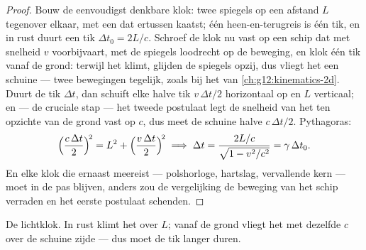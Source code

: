 \begin{proof}
Bouw de eenvoudigst denkbare klok: twee spiegels op een afstand $L$ tegenover
elkaar, met een  dat ertussen kaatst; één heen-en-terugreis is één tik, en
in rust duurt een tik $\Delta t_0 = 2L/c$. Schroef de klok nu vast op een schip
dat met snelheid $v$ voorbijvaart, met de spiegels loodrecht op de beweging, en
klok één tik vanaf de grond: terwijl het  klimt, glijden de spiegels
opzij, dus vliegt het  een schuine  --- twee bewegingen tegelijk, zoals
bij het  van \cref{ch:g12:kinematics-2d}. Duurt de tik $\Delta t$,
dan schuift elke halve tik $v\,\Delta t/2$ horizontaal op en $L$ verticaal; en
--- de cruciale stap --- het tweede postulaat legt de snelheid van het  ten
opzichte van de grond vast op $c$, dus meet de schuine halve 
$c\,\Delta t/2$. Pythagoras:
\[
\Bigl(\frac{c\,\Delta t}{2}\Bigr)^{\!2} = L^2 + \Bigl(\frac{v\,\Delta t}{2}\Bigr)^{\!2}
\;\Longrightarrow\;
\Delta t = \frac{2L/c}{\sqrt{1 - v^2/c^2}} = \gamma\,\Delta t_0 .
\]
En elke klok die ernaast meereist --- polshorloge, hartslag, vervallende kern
--- moet in de pas blijven, anders zou de vergelijking de beweging van het schip
verraden en het eerste postulaat schenden.
\end{proof}

\begin{omfigure}
\qquad
{}

{\small De lichtklok. In rust klimt het  over $L$; vanaf de grond vliegt
het met dezelfde $c$ over de schuine zijde --- dus moet de tik langer duren.}
\end{omfigure}

